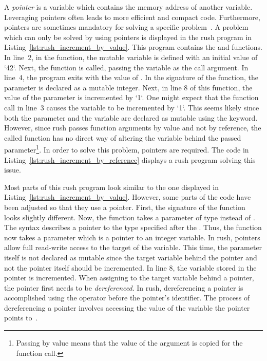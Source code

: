 
A \emph{pointer} is a variable which contains the memory address of another variable.
Leveraging pointers often leads to more efficient and compact code.
Furthermore, pointers are sometimes mandatory for solving a specific problem~\cite[p.~93]{Ritchie1988}.
A problem which can only be solved by using pointers is displayed in the rush program in Listing~\ref{lst:rush_increment_by_value}.
This program contains the  and  functions.
In line~2, in the  function, the mutable variable  is defined with an initial value of `42`.
Next, the  function is called, passing the variable as the call argument.
In line~4, the program exits with the value of .
In the signature of the  function, the  parameter is declared as a mutable integer.
Next, in line 8 of this function, the value of the parameter is incremented by `1`.
One might expect that the function call in line~3 causes the variable  to be incremented by `1`.
This seems likely since both the parameter and the variable are declared as mutable using the  keyword.
However, since rush passes function arguments by value and not by reference, the called function has no direct way of altering the variable behind the passed parameter\footnote{Passing by value means that the value of the argument is copied for the function call.}.
In order to solve this problem, pointers are required.
The code in Listing~\ref{lst:rush_increment_by_reference} displays a rush program solving this issue.


Most parts of this rush program look similar to the one displayed in Listing~\ref{lst:rush_increment_by_value}.
However, some parts of the code have been adjusted so that they use a pointer.
First, the signature of the  function looks slightly different.
Now, the function takes a parameter of type  instead of .
The syntax  describes a pointer to the type specified after the \qVerb{*}.
Thus, the function now takes a parameter which is a pointer to an integer variable.
In rush, pointers allow full read-write access to the target of the variable.
This time, the parameter itself is not declared as mutable since the target variable behind the pointer and not the pointer itself should be incremented.
In line 8, the variable stored in the pointer is incremented.
When assigning to the target variable behind a pointer, the pointer first needs to be \emph{dereferenced}.
In rush, dereferencing a pointer is accomplished using the \qVerb{*} operator before the pointer's identifier.
The process of dereferencing a pointer involves accessing the value of the variable the pointer points to~\cite[p.~94]{Ritchie1988}.

